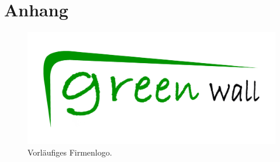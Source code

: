 \chapter{Anhang}

\begin{figure}[h]
    \centering
    \includegraphics[width=\textwidth]{green_wall_logo.jpg}
    \caption[Vorläufiges Firmenlogo]{Vorläufiges Firmenlogo.}\label{fig:logo}
\end{figure}